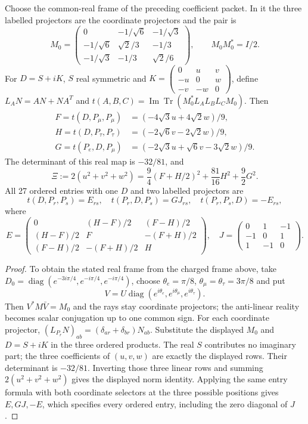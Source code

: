 \documentclass[11pt,a4paper]{article}
\begin{document}
\begin{proposition}
\label{p5c:prop:v2217-ordered-trace-reconstruction}
Choose the common-real frame of the preceding coefficient packet. In it
the three labelled projectors are the coordinate projectors and the pair is
\[
 M_0=\begin{pmatrix}
 0&-1/\sqrt6&-1/\sqrt3\\
 -1/\sqrt6&\sqrt2/3&-1/3\\
 -1/\sqrt3&-1/3&\sqrt2/6
 \end{pmatrix},\qquad M_0M_0^*=I/2.
\]
For $D=S+iK$, $S$ real symmetric and
$K=\left(\begin{smallmatrix}0&u&v\\-u&0&w\\-v&-w&0\end{smallmatrix}\right)$,
define $L_AN=AN+NA^T$ and
$t(A,B,C)=\operatorname{Im}\operatorname{Tr}(M_0^*L_AL_BL_CM_0)$.
Then
\begin{align*}
 F=t(D,P_\mu,P_\mu)&=(-4\sqrt3u+4\sqrt2w)/9,\\
 H=t(D,P_\tau,P_\tau)&=(-2\sqrt6v-2\sqrt2w)/9,\\
 G=t(P_e,D,P_\mu)&=(-2\sqrt3u+\sqrt6v-3\sqrt2w)/9.
\end{align*}
The determinant of this real map is $-32/81$, and
\[
 \Xi:=2(u^2+v^2+w^2)
 =\frac94(F+H/2)^2+\frac{81}{16}H^2+\frac92G^2.
\]
All 27 ordered entries with one $D$ and two labelled projectors are
\[
 t(D,P_r,P_s)=E_{rs},\quad t(P_r,D,P_s)=GJ_{rs},\quad
 t(P_r,P_s,D)=-E_{rs},
\]
where
\[
 E=\begin{pmatrix}0&(H-F)/2&(F-H)/2\\
 (H-F)/2&F&-(F+H)/2\\(F-H)/2&-(F+H)/2&H\end{pmatrix},\quad
 J=\begin{pmatrix}0&1&-1\\-1&0&1\\1&-1&0\end{pmatrix}.
\]
\end{proposition}
\begin{proof}
To obtain the stated real frame from the charged frame above, take
$D_0=\operatorname{diag}(e^{-3i\pi/4},e^{-i\pi/4},e^{-i\pi/4})$,
choose $\theta_e=\pi/8$, $\theta_\mu=\theta_\tau=3\pi/8$ and put
\[
 V=U\operatorname{diag}(e^{i\theta_e},e^{i\theta_\mu},e^{i\theta_\tau}).
\]
Then $V^*M\bar V=M_0$ and the rays stay coordinate projectors; the
anti-linear reality becomes scalar conjugation up to one common sign.
For each coordinate projector,
$(L_{P_r}N)_{ab}=(\delta_{ar}+\delta_{br})N_{ab}$.
Substitute the displayed $M_0$ and $D=S+iK$ in the three ordered products.
The real $S$ contributes no imaginary part; the three coefficients of
$(u,v,w)$ are exactly the displayed rows. Their determinant is $-32/81$.
Inverting those three linear rows and summing $2(u^2+v^2+w^2)$ gives
the displayed norm identity. Applying the same entry formula with both
coordinate selectors at the three possible positions gives $E,GJ,-E$,
which specifies every ordered entry, including the zero diagonal of $J$.
\end{proof}
\end{document}

